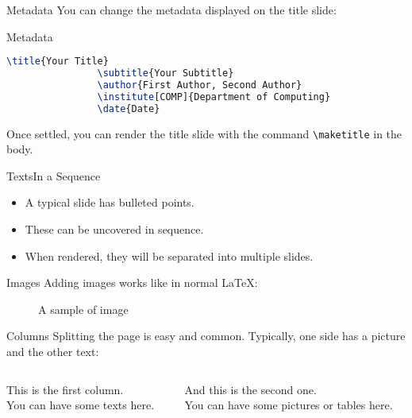 \documentclass[10pt,aspectratio=169]{beamer}
\begin{document}
	\begin{frame}[fragile]{Metadata}
		You can change the metadata displayed on the title slide:
		\begin{block}{Metadata}
			\begin{lstlisting}[language=TeX]
				\title{Your Title}
				\subtitle{Your Subtitle}
				\author{First Author, Second Author}
				\institute[COMP]{Department of Computing}
				\date{Date}
			\end{lstlisting}
		\end{block}
		Once settled, you can render the title slide with the command \verb|\maketitle| in the body.
	\end{frame}

	\begin{frame}[fragile]{Texts}{In a Sequence}
		\begin{itemize}[<+->]
			\item A typical slide has bulleted points.
			\item These can be uncovered in sequence.
			\item When rendered, they will be separated into multiple slides.
		\end{itemize}
	\end{frame}

	\begin{frame}{Images}
		Adding images works like in normal \LaTeX:
		\begin{figure}[hbt]
			\caption{A sample of image}
		\end{figure}
	\end{frame}

	\begin{frame}{Columns}
		Splitting the page is easy and common.
		Typically, one side has a picture and the other text:
		\vspace{20pt}
		\begin{columns}
			\begin{column}{0.6\textwidth}
				This is the first column.\\[10pt]
				You can have some texts here.
			\end{column}
			\begin{column}{0.3\textwidth}
				And this is the second one.\\[10pt]
				You can have some pictures or tables here.
			\end{column}
		\end{columns}
	\end{frame}
\end{document}
